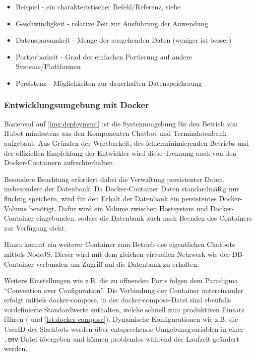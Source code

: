 \begin{itemize}
    \item Beispiel - ein charakteristischer Befehl/Referenz, siehe \cite{HubotDeploying2018}
    \item Geschwindigkeit - relative Zeit zur Ausführung der Anwendung
    \item Datensparsamkeit - Menge der ausgehenden Daten (weniger ist besser)
    \item Portierbarkeit - Grad der einfachen Portierung auf andere Systeme/Plattformen
    \item Persistenz - Möglichkeiten zur dauerhaften Datenspeicherung
\end{itemize}


\subsubsection{Entwicklungsumgebung mit Docker}

Basierend auf \autoref{img:deployment} ist die Systemumgebung für den Betrieb von Hubot mindestens aus den Komponenten Chatbot und Termindatenbank aufgebaut. Aus Gründen der Wartbarkeit, des fehlerminimierenden Betriebs und der offiziellen Empfehlung der Entwickler wird diese Trennung auch von den Docker-Containern aufrechterhalten.

Besondere Beachtung erfordert dabei die Verwaltung persistenter Daten, insbesondere der Datenbank. Da Docker-Container Daten standardmäßig nur flüchtig speichern, %
wird für den Erhalt der Datenbank ein persistentes Docker-Volume benötigt. Dafür wird ein Volume zwischen Hostsystem und Docker-Container eingebunden, sodass die Datenbank auch nach Beenden des Containers zur Verfügung steht.

Hinzu kommt ein weiterer Container zum Betrieb des eigentlichen Chatbots mittels NodeJS. Dieser wird mit dem gleichen virtuellen Netzwerk wie der DB-Container verbunden um Zugriff auf die Datenbank zu erhalten.

Weitere Einstellungen wie z.B. die zu öffnenden Ports folgen dem Paradigma \enquote{Convention over Configuration}. \cite{NicholasChenConventionConfiguration2006} Die Verbindung der Container untereinander erfolgt mittels docker-compose, in der docker-compose-Datei sind ebenfalls vordefinierte Standardwerte enthalten, welche schnell zum produktiven Einsatz führen (\cite{DockerInc.DockerCompose2018} und \autoref{lst:docker-compose}).
Dynamische Konfigurationen wie z.B. die UserID des Slackbots werden über entsprechende Umgebunsgvariablen in einer \verb+.env+-Datei übergeben und können problemlos während der Laufzeit geändert werden.

